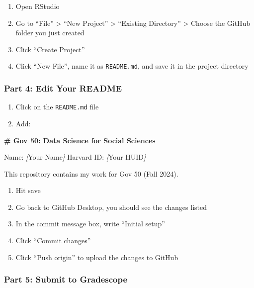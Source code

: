 \documentclass[
  11pt,
  letterpaper]{article}
\newenvironment{Shaded}{\begin{snugshade}}{\end{snugshade}}
\newcommand{\CommentTok}[1]{\textcolor[rgb]{0.56,0.35,0.01}{\textit{#1}}}
\newcommand{\FunctionTok}[1]{\textcolor[rgb]{0.13,0.29,0.53}{\textbf{#1}}}
\newcommand{\NormalTok}[1]{#1}
\newcommand{\OtherTok}[1]{\textcolor[rgb]{0.56,0.35,0.01}{#1}}
\providecommand{\tightlist}{%
  \setlength{\itemsep}{0pt}\setlength{\parskip}{0pt}}
\begin{document}
\begin{enumerate}
\def\labelenumi{\arabic{enumi}.}
\tightlist
\item
  Open RStudio
\item
  Go to ``File'' \textgreater{} ``New Project'' \textgreater{}
  ``Existing Directory'' \textgreater{} Choose the GitHub folder you
  just created
\item
  Click ``Create Project''
\item
  Click ``New File'', name it as \texttt{README.md}, and save it in the
  project directory
\end{enumerate}

\subsubsection{Part 4: Edit Your README}\label{part-4-edit-your-readme}

\begin{enumerate}
\def\labelenumi{\arabic{enumi}.}
\tightlist
\item
  Click on the \texttt{README.md} file
\item
  Add:
\end{enumerate}

\begin{Shaded}
\begin{Highlighting}[]
\FunctionTok{\# Gov 50: Data Science for Social Sciences}

\NormalTok{Name: }\CommentTok{[}\OtherTok{Your Name}\CommentTok{]}
\NormalTok{Harvard ID: }\CommentTok{[}\OtherTok{Your HUID}\CommentTok{]}

\NormalTok{This repository contains my work for Gov 50 (Fall 2024).}
\end{Highlighting}
\end{Shaded}

\begin{enumerate}
\def\labelenumi{\arabic{enumi}.}
\setcounter{enumi}{2}
\tightlist
\item
  Hit save
\item
  Go back to GitHub Desktop, you should see the changes listed
\item
  In the commit message box, write ``Initial setup''
\item
  Click ``Commit changes''
\item
  Click ``Push origin'' to upload the changes to GitHub
\end{enumerate}

\subsubsection{Part 5: Submit to
Gradescope}\label{part-5-submit-to-gradescope}
\end{document}
